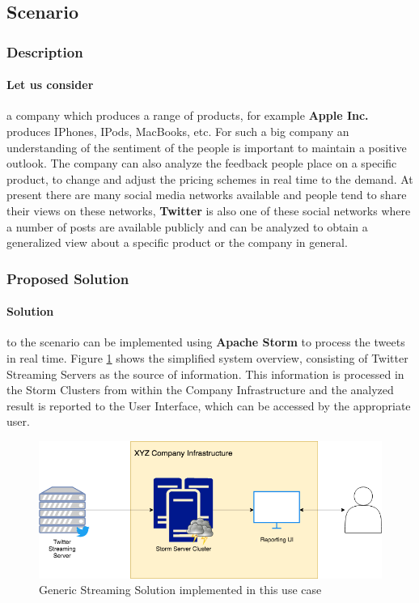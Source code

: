 \documentclass[runningheads,a4paper]{llncs}[2015/06/24]
\begin{document}
\subsection{Scenario}

\subsubsection{Description}
\paragraph{Let us consider} a company which produces a range of products, for example \textbf{Apple Inc.} produces IPhones, IPods, MacBooks, etc. For such a big company an understanding of the sentiment of the people is important to maintain a positive outlook. The company can also analyze the feedback people place on a specific product, to change and adjust the pricing schemes in real time to the demand.  At present there are many social media networks available and people tend to share their views on these networks,  \textbf{Twitter} is also one of these social networks where a number of posts are available publicly and can be analyzed to obtain a generalized view about a specific product or the company in general.

\subsubsection{Proposed Solution}

\paragraph{Solution} to the scenario can be implemented using \textbf{Apache Storm} to process the tweets in real time. Figure \ref{fig:solution} shows the simplified system overview, consisting of Twitter Streaming Servers as the source of information. This information is processed in the Storm Clusters from within the Company Infrastructure and the analyzed result is reported to the User Interface, which can be accessed by the appropriate user.

\begin{figure}
  \begin{center}
    \includegraphics[width=.7\textwidth]{solution.png}
    \caption{Generic Streaming Solution implemented in this use case}
    \label{fig:solution}
   \end{center}
\end{figure}
\end{document}
